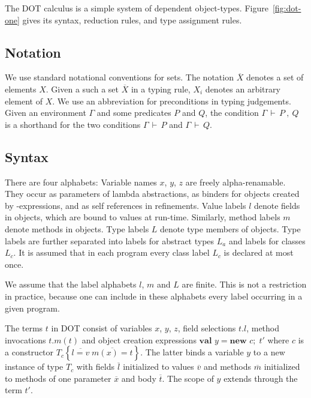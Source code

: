 \documentclass[9pt]{sigplanconf}
\newcommand{\figref}[1]
        {Figure~\ref{fig:#1}}
\newcommand{\ts}{\,\vdash\,}
\newcommand{\spcomma}{~,~}
\newcommand{\ldefs}[1]{\left\{#1\right\}}
\newcommand{\seq}[1]{\overline{#1}}
\newcommand{\new}[3]{\textbf{val }#1 = \textbf{new }#2 ;\; #3}
\begin{document}
The DOT calculus is a simple system of dependent
object-types. \figref{dot-one} gives its syntax, reduction rules,
and type assignment rules.

\subsection{Notation} We use standard notational conventions for
sets. The notation $\seq{X}$ denotes a set of elements $X$. Given a
such a set $\seq X$ in a typing rule, $X_i$ denotes an arbitrary
element of $X$. 
We use an
abbreviation for preconditions in typing judgements. Given an
environment $\Gamma$ and some predicates $P$ and $Q$, the condition $\Gamma \ts P \spcomma Q$
is a shorthand for the two conditions $\Gamma \ts P$ and $\Gamma \ts Q$.

\subsection{Syntax}

There are four alphabets: Variable names $x$, $y$, $z$ are freely
alpha-renamable. They occur as parameters of lambda abstractions, as
binders for objects created by \verb@new@-expressions, and as self
references in refinements. Value labels $l$ denote fields in objects,
which are bound to values at run-time. Similarly, method labels $m$
denote methods in objects. Type labels $L$ denote type members of
objects. Type labels are further separated into labels for abstract
types $L_a$ and labels for classes $L_c$. It is assumed that in each
program every class label $L_c$ is declared at most once.

We assume that the label alphabets $l$, $m$ and $L$ are finite. This is
not a restriction in practice, because one can include in these 
alphabets every label occurring in a given program.

The terms $t$ in DOT consist of variables $x$, $y$, $z$, field
selections $t.l$, method invocations $t.m(t)$ and object creation
expressions $\new y c {t'}$ where $c$ is a constructor $T_c \ldefs{\seq{l
    = v}\;\seq{m(x) = t}}$. The latter binds a variable $y$ to a new
instance of type $T_c$ with fields $\seq l$ initialized to values
$\seq v$ and methods $\seq m$ initialized to methods of one parameter
$\seq{x}$ and body $\seq{t}$.  The scope of $y$ extends through the term
${t'}$.
\end{document}
